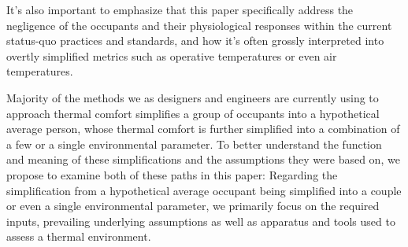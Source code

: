 It's also important to emphasize that this paper specifically address the negligence of the occupants and their physiological responses within the current status-quo practices and standards, and how it's often grossly interpreted into overtly simplified metrics such as operative temperatures or even air temperatures.

Majority of the methods we as designers and engineers are currently using to approach thermal comfort simplifies a group of occupants into a hypothetical average person, whose thermal comfort is further simplified into a combination of a few or a single environmental parameter. To better understand the function and meaning of these simplifications and the assumptions they were based on, we propose to examine both of these paths in this paper: Regarding the simplification from a hypothetical average occupant being simplified into a couple or even a single environmental parameter, we primarily focus on the required inputs, prevailing underlying assumptions
as well as apparatus and tools used to assess a thermal environment.
